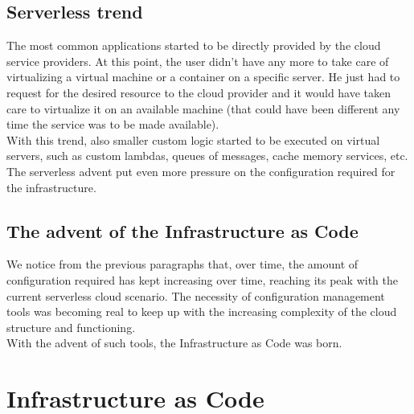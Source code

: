 \subsection{Serverless trend}
The most common applications started to be directly provided by the cloud service providers.
At this point, the user didn't have any more to take care of virtualizing a virtual machine or a container on a specific server.
He just had to request for the desired resource to the cloud provider and it would have taken care to virtualize it on an available machine (that could have been different any time the service was to be made available).\\
With this trend, also smaller custom logic started to be executed on virtual servers, such as custom lambdas, queues of messages, cache memory services, etc.\\
The serverless advent put even more pressure on the configuration required for the infrastructure.

\subsection{The advent of the Infrastructure as Code}
We notice from the previous paragraphs that, over time, the amount of configuration required has kept increasing over time, reaching its peak with the current serverless cloud scenario.
The necessity of configuration management tools was becoming real to keep up with the increasing complexity of the cloud structure and functioning.\\
With the advent of such tools, the Infrastructure as Code was born.


\section{Infrastructure as Code}

